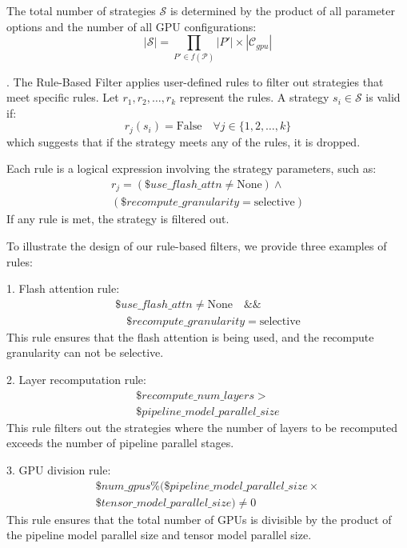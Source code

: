 The total number of strategies $\mathcal{S}$ is determined by the product of all parameter options and the number of all GPU configurations:
\begin{equation}
    |\mathcal{S}| = \prod_{P' \in f(\mathcal{P})} |P'| \times |\mathcal{C}_{gpu}|
\end{equation}

. The Rule-Based Filter applies user-defined rules to filter out strategies that meet specific rules. Let $r_1, r_2, \dots, r_k$ represent the rules. A strategy $s_i \in \mathcal{S}$ is valid if:
\begin{equation}
    r_j(s_i) = \text{False} \quad \forall j \in \{1, 2, \dots, k\}
\end{equation}
which suggests that if the strategy meets any of the rules, it is dropped.

Each rule is a logical expression involving the strategy parameters, such as:
\begin{align}
    r_j = (\$use\_flash\_attn \neq \text{None}) \land 
    \\
    (\$recompute\_granularity = \text{selective})
\end{align}
If any rule is met, the strategy is filtered out.

To illustrate the design of our rule-based filters, we provide three examples of rules:

1. Flash attention rule:
\begin{align}
    \$use\_flash\_attn \neq \text{None} \quad \&\& 
    \\
    \quad \$recompute\_granularity = \text{selective}
\end{align}
This rule ensures that the flash attention is being used, 
and the recompute granularity can not be selective.

2. Layer recomputation rule:
\begin{align}
    \$recompute\_num\_layers > 
    \\
    \$pipeline\_model\_parallel\_size
\end{align}
This rule filters out the strategies where the number of layers to be recomputed exceeds the number of pipeline parallel stages.

3. GPU division rule:
\begin{align}
    \$num\_gpus \% (\$pipeline\_model\_parallel\_size \times 
    \\
    \$tensor\_model\_parallel\_size) \neq 0
\end{align}
This rule ensures that the total number of GPUs is divisible by the product of the pipeline model parallel size and tensor model parallel size.

